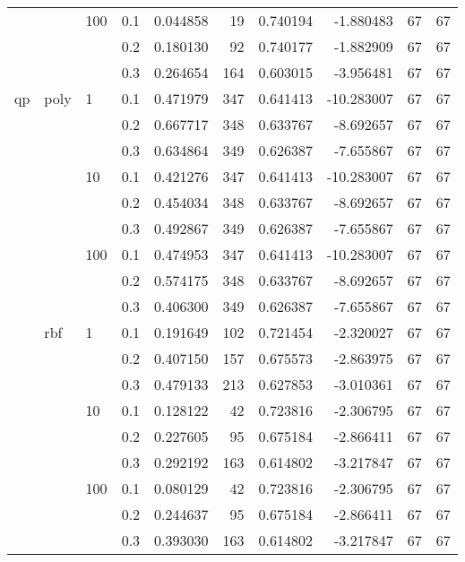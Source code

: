\begin{table}[H]
\begin{tabular}{llllrrrrrr}
   &     & 100 & 0.1 &  0.044858 &      19 &  0.740194 &  -1.880483 &          67 &        67 \\
   &     &     & 0.2 &  0.180130 &      92 &  0.740177 &  -1.882909 &          67 &        67 \\
   &     &     & 0.3 &  0.264654 &     164 &  0.603015 &  -3.956481 &          67 &        67 \\
qp & poly & 1   & 0.1 &  0.471979 &     347 &  0.641413 & -10.283007 &          67 &        67 \\
   &     &     & 0.2 &  0.667717 &     348 &  0.633767 &  -8.692657 &          67 &        67 \\
   &     &     & 0.3 &  0.634864 &     349 &  0.626387 &  -7.655867 &          67 &        67 \\
   &     & 10  & 0.1 &  0.421276 &     347 &  0.641413 & -10.283007 &          67 &        67 \\
   &     &     & 0.2 &  0.454034 &     348 &  0.633767 &  -8.692657 &          67 &        67 \\
   &     &     & 0.3 &  0.492867 &     349 &  0.626387 &  -7.655867 &          67 &        67 \\
   &     & 100 & 0.1 &  0.474953 &     347 &  0.641413 & -10.283007 &          67 &        67 \\
   &     &     & 0.2 &  0.574175 &     348 &  0.633767 &  -8.692657 &          67 &        67 \\
   &     &     & 0.3 &  0.406300 &     349 &  0.626387 &  -7.655867 &          67 &        67 \\
   & rbf & 1   & 0.1 &  0.191649 &     102 &  0.721454 &  -2.320027 &          67 &        67 \\
   &     &     & 0.2 &  0.407150 &     157 &  0.675573 &  -2.863975 &          67 &        67 \\
   &     &     & 0.3 &  0.479133 &     213 &  0.627853 &  -3.010361 &          67 &        67 \\
   &     & 10  & 0.1 &  0.128122 &      42 &  0.723816 &  -2.306795 &          67 &        67 \\
   &     &     & 0.2 &  0.227605 &      95 &  0.675184 &  -2.866411 &          67 &        67 \\
   &     &     & 0.3 &  0.292192 &     163 &  0.614802 &  -3.217847 &          67 &        67 \\
   &     & 100 & 0.1 &  0.080129 &      42 &  0.723816 &  -2.306795 &          67 &        67 \\
   &     &     & 0.2 &  0.244637 &      95 &  0.675184 &  -2.866411 &          67 &        67 \\
   &     &     & 0.3 &  0.393030 &     163 &  0.614802 &  -3.217847 &          67 &        67 \\
\bottomrule
\end{tabular}
\end{table}
